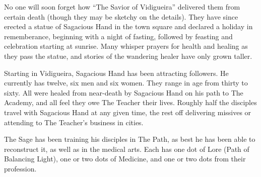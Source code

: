 
No one will soon forget how ``The Savior of Vidigueira'' delivered them from
certain death (though they may be sketchy on the details). They have since
erected a statue of Sagacious Hand in the town square and declared a holiday in
rememberance, beginning with a night of fasting, followed by feasting and
celebration starting at sunrise. Many whisper prayers for health and healing as
they pass the statue, and stories of the wandering healer have only grown
taller.



Starting in Vidigueira, Sagacious Hand has been attracting followers. He
currently has twelve, six men and six women. They range in age from thirty to
sixty. All were healed from near-death by Sagacious Hand on his path to The
Academy, and all feel they owe The Teacher their lives. Roughly half the
disciples travel with Sagacious Hand at any given time, the rest off delivering
missives or attending to The Teacher's business in cities.

The Sage has been training his disciples in The Path, as best he has been able
to reconstruct it, as well as in the medical arts. Each has one dot of Lore
(Path of Balancing Light), one or two dots of Medicine, and one or two dots
from their profession.


\printbibliography[title=References]


